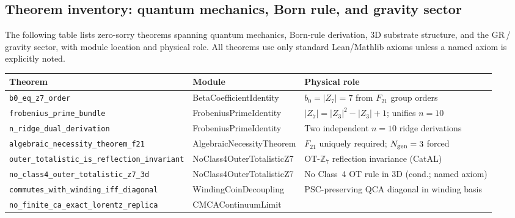 \documentclass[11pt,a4paper]{article}
\theoremstyle{definition}
\begin{document}
\subsection{Theorem inventory: quantum mechanics, Born rule, and gravity sector}\label{subsec:new-theorem-inventory}

The following table lists zero-sorry theorems spanning quantum mechanics,
Born-rule derivation, 3D substrate structure, and the GR\,/\,gravity sector,
with module location and physical role.  All theorems use only standard Lean/Mathlib
axioms unless a named axiom is explicitly noted.

\begin{table}[h]
\centering\footnotesize
\setlength{\tabcolsep}{4pt}
\begin{tabular}{@{}p{5.2cm}p{3.5cm}p{6.6cm}@{}}
\toprule
Theorem & Module & Physical role \\
\midrule
\texttt{b0\_\allowbreak eq\_\allowbreak z7\_\allowbreak order}
  & BetaCoefficient\allowbreak Identity
  & $b_0 = |Z_7| = 7$ from $F_{21}$ group orders \\[1pt]
\texttt{frobenius\_\allowbreak prime\_\allowbreak bundle}
  & FrobeniusPrime\allowbreak Identity
  & $|Z_7| = |Z_3|^2 - |Z_3| + 1$; unifies $n=10$ \\[1pt]
\texttt{n\_\allowbreak ridge\_\allowbreak dual\_\allowbreak derivation}
  & FrobeniusPrime\allowbreak Identity
  & Two independent $n=10$ ridge derivations \\[1pt]
\texttt{algebraic\_\allowbreak necessity\_\allowbreak theorem\_\allowbreak f21}
  & AlgebraicNecessity\allowbreak Theorem
  & $F_{21}$ uniquely required; $N_{\rm gen}=3$ forced \\[1pt]
\texttt{outer\_\allowbreak totalistic\_\allowbreak is\_\allowbreak reflection\_\allowbreak invariant}
  & NoClass4Outer\allowbreak TotalisticZ7
  & OT-$\mathbb{Z}_7$ reflection invariance (CatAL) \\[1pt]
\texttt{no\_\allowbreak class4\_\allowbreak outer\_\allowbreak totalistic\_\allowbreak z7\_\allowbreak 3d}
  & NoClass4Outer\allowbreak TotalisticZ7
  & No Class~4 OT rule in 3D (cond.; named axiom) \\[1pt]
\texttt{commutes\_\allowbreak with\_\allowbreak winding\_\allowbreak iff\_\allowbreak diagonal}
  & WindingCoin\allowbreak Decoupling
  & PSC-preserving QCA diagonal in winding basis \\[1pt]
\texttt{no\_\allowbreak finite\_\allowbreak ca\_\allowbreak exact\_\allowbreak lorentz\_\allowbreak replica}
  & CMCAContinuum\allowbreak Limit

\end{tabular}
\end{table}
\end{document}
